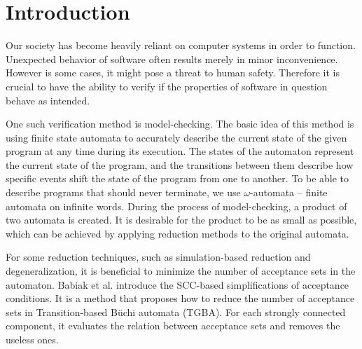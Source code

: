 \documentclass[
  digital, %
  twoside, %
  table,   %
  lof,     %
  lot,     %
]{fithesis3}
\begin{document}

\newcommand{\accmarkblue}{\begin{tikzpicture} \node[accset, collacc0] {}; \end{tikzpicture}}
\newcommand{\accmarkmag}{\begin{tikzpicture} \node[accset, collacc1] {}; \end{tikzpicture}}
\newcommand{\accmarkor}{\begin{tikzpicture} \node[accset, collacc2] {}; \end{tikzpicture}}
\newcommand{\accsquare}{\begin{tikzpicture} \node[accset, collacc0] {}; \end{tikzpicture}}

\chapter{Introduction}
Our society has become heavily reliant on computer systems in order to function. Unexpected behavior of software often results merely in minor inconvenience. However is some cases, it might pose a threat to human safety. Therefore it is crucial to have the ability to verify if the properties of software in question behave as intended. 

One such verification method is model-checking. The basic idea of this method is using finite state automata to accurately describe the current state of the given program at any time during its execution. The states of the automaton represent the current state of the program, and the transitions between them describe how specific events shift the state of the program from one to another. To be able to describe programs that should never terminate, we use $\omega$-automata -- finite automata on infinite words. During the process of model-checking, a product of two automata is created. It is desirable for the product to be as small as possible, which can be achieved by applying reduction methods to the original automata. 

For some reduction techniques, such as simulation-based reduction and degeneralization, it is beneficial to minimize the number of acceptance sets in the automaton. Babiak et al. \cite{spin2013} introduce the SCC-based simplifications of acceptance conditions. It is a method that proposes how to reduce the number of acceptance sets in Transition-based Büchi automata (TGBA). For each strongly connected component, it evaluates the relation between acceptance sets and removes the useless ones. 
\end{document}
